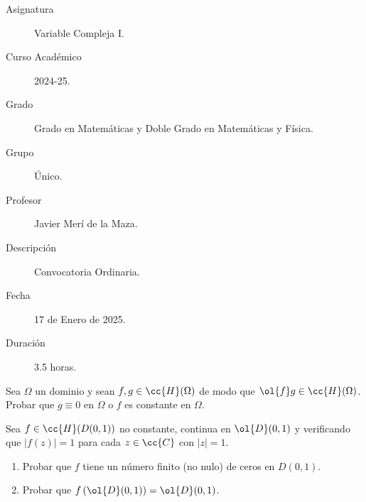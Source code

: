 \documentclass[12pt]{article}
\begin{document}

    
    

    \begin{description}
        \item[Asignatura] Variable Compleja I.
        \item[Curso Académico] 2024-25.
        \item[Grado] Grado en Matemáticas y Doble Grado en Matemáticas y Física.
        \item[Grupo] Único.
        \item[Profesor] Javier Merí de la Maza.
        \item[Descripción] Convocatoria Ordinaria.
        \item[Fecha] 17 de Enero de 2025.
        \item[Duración] 3.5 horas.
    \end{description}
    \newpage

    \begin{ejercicio}[2.5 puntos]
        Sea $\Omega$ un dominio y sean $f, g \in \cc{H}(\Omega)$ de modo que $\ol{f}g\in \cc{H}(\Omega)$.
        Probar que $g \equiv 0$ en $\Omega$ o $f$ es constante en $\Omega$.        
    \end{ejercicio}

    \begin{ejercicio}[2.5 puntos]
        Sea $f \in \cc{H}(D(0, 1))$ no constante, continua en $\ol{D}(0, 1)$ y verificando que $|f(z)| = 1$ para cada $z \in \cc{C}$ con $|z| = 1$.
        \begin{enumerate}
            \item Probar que $f$ tiene un número finito (no nulo) de ceros en $D(0, 1)$.
            \item Probar que $f\left(\ol{D}(0, 1)\right) = \ol{D}(0, 1)$.
        \end{enumerate}
    \end{ejercicio}
\end{document}
